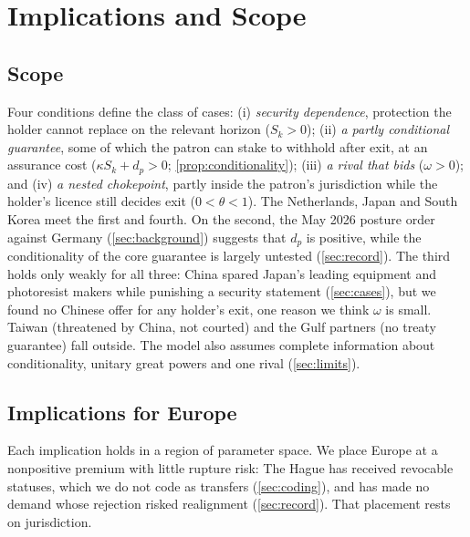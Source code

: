 \section{Implications and Scope}\label{sec:implications}

\subsection{Scope}\label{sec:scope}

Four conditions define the class of cases: (i) \emph{security dependence}, protection the holder cannot replace on the relevant horizon ($S_k>0$); (ii) \emph{a partly conditional guarantee}, some of which the patron can stake to withhold after exit, at an assurance cost ($\kappa S_k+d_p>0$; \cref{prop:conditionality}); (iii) \emph{a rival that bids} ($\omega>0$); and (iv) \emph{a nested chokepoint}, partly inside the patron's jurisdiction while the holder's licence still decides exit ($0<\theta<1$). The Netherlands, Japan and South Korea meet the first and fourth. On the second, the May 2026 posture order against Germany (\cref{sec:background}) suggests that $d_p$ is positive, while the conditionality of the core guarantee is largely untested (\cref{sec:record}). The third holds only weakly for all three: China spared Japan's leading equipment and photoresist makers while punishing a security statement (\cref{sec:cases}), but we found no Chinese offer for any holder's exit, one reason we think $\omega$ is small. Taiwan (threatened by China, not courted) and the Gulf partners (no treaty guarantee) fall outside. The model also assumes complete information about conditionality, unitary great powers and one rival (\cref{sec:limits}).

\subsection{Implications for Europe}

Each implication holds in a region of parameter space. We place Europe at a nonpositive premium with little rupture risk: The Hague has received revocable statuses, which we do not code as transfers (\cref{sec:coding}), and has made no demand whose rejection risked realignment (\cref{sec:record}). That placement rests on jurisdiction.


